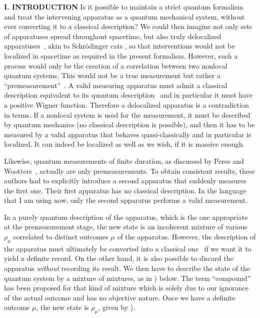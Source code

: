 \begin{center}{\bf I. INTRODUCTION}
Is it possible to maintain a strict quantum formalism and treat the
intervening apparatus as a quantum mechanical system, without ever
converting it to a classical description? We could then imagine not only
sets of apparatuses spread throughout spacetime, but also truly
delocalized apparatuses~\cite{AA80}, akin to Schr\"odinger cats
\cite{monroe,placek}, so that interventions would not be localized in
spacetime as required in the present formalism. However, such a process
would only be the creation of a correlation between two nonlocal quantum
systems. This would not be a true measurement but rather a
``premeasurement''~\cite{undo}. A valid measuring apparatus must admit a
classical description equivalent to its quantum description~\cite{hay}
and in particular it must have a positive Wigner function. Therefore a
delocalized apparatus is a contradiction in terms. If a nonlocal system
is used for the measurement, it must be described by quantum mechanics
(no classical description is possible), and then it has to be measured
by a valid apparatus that behaves quasi-classically and in particular is
localized. It can indeed be localized as well as we wish, if it is
massive enough.

Likewise, quantum measurements of finite duration, as discussed by Peres
and Wootters~\cite{PW85}, actually are only premeasurements. To obtain
consistent results, these authors had to explicitly introduce a second
apparatus that suddenly measures the first one. Their first apparatus
has no classical description. In the language that I am using now, only
the second apparatus performs a valid measurement.

In a purely quantum description of the apparatus, which is the one
appropriate at the premeasurement stage, the new state is an incoherent
mixture of various $\rho_\mu$ correlated to distinct outcomes $\mu$ of
the apparatus. However, the description of the apparatus must ultimately
be converted into a classical one~\cite{Bohr1939,hay} if we want it to
yield a definite record. On the other hand, it is also possible to
discard the apparatus {\it without\/} recording its result. We then have
to describe the state of the quantum system by a mixture of mixtures, as
in ) below. The term ``compound''~\cite{marlow} has been
proposed for that kind of mixture which is solely due to our ignorance
of the actual outcome and has no objective nature. Once we have a
definite outcome $\mu$, the new state is $\rho_\mu$, given by
).\clearpage

\ec


\end{center}
